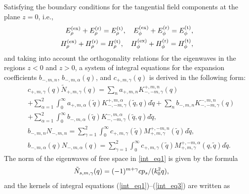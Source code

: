 \documentclass[summary]{URSIGASS2020}
\def\f{\phi}
\begin{document}
Satisfying the boundary conditions for the tangential field components at the plane $ z=0 $, i.e.,
\begin{eqnarray}\label{bound_cond}
&&\hspace{-5mm}{E}^{(\rm ex)}_{\rho}+{E}^{(\rm r)}_{\rho}={E}^{(\rm t)}_{\rho},\quad {E}^{(\rm ex)}_{\f}+{E}^{(\rm r)}_{\f}={E}^{(\rm t)}_{\f},\nonumber\\
&&\hspace{-5mm}{H}^{(\rm ex)}_{\rho}+{H}^{(\rm r)}_{\rho}={H}^{(\rm t)}_{\rho},\quad {H}^{(\rm ex)}_{\f}+{H}^{(\rm r)}_{\f}={H}^{(\rm t)}_{\f},
\end{eqnarray}
and taking into account the orthogonality relations for the eigenwaves in the regions $ z<0 $ and $ z>0 $, a system of integral equations for the expansion coefficients $ b_{-,m,n} $, $ b_{-,m,\alpha}(q) $, and $ c_{+,m,\gamma}(q) $ is derived in the following form:
\begin{align}
&c_{+,m,\gamma}(q)\tilde{N}_{+,m,\gamma}(q)=\sum_{n}a_{+,m,n}K_{-,-m,\gamma}^{+,m,n}(q) \nonumber\\
&+ \sum_{\alpha=1}^{2}\int_{0}^{\infty}\!\!\!a_{+,m,\alpha}(\tilde{q})K_{-,-m,\gamma}^{+,m,\alpha}(\tilde{q},q)d\tilde{q} \nonumber+\sum_{n}b_{-,m,n}K_{-,-m,\gamma}^{-,m,n}(q) \\
&+\sum_{\alpha=1}^{2}\int_{0}^{\infty}\!\!\!b_{-,m,\alpha}(\tilde{q})K_{-,-m,\gamma}^{-,m,\alpha}(\tilde{q},q)d\tilde{q}, \label{int_eq1} \\ 
&b_{-,m,n}N_{-,m,n}=\sum_{\gamma=1}^{2}\int_{0}^{\infty}\!\!\!\!c_{+,m,\gamma}(\tilde{q})M_{+,m,\gamma}^{+,-m,n}(\tilde{q})d\tilde{q}, \label{int_eq2} \\
&b_{-,m,\alpha}({q})N_{-,m,\alpha}({q})\!=\!\!\!\sum_{\gamma=1}^{2}\!\int_{0}^{\infty}\!\!\!\!\!\!\!c_{+,m,\gamma}(\tilde{q})M_{+,m,\gamma}^{+,-m,\alpha}(q,\tilde{q})d\tilde{q}. \label{int_eq3}
\end{align}
The norm of the eigenwaves of free space in \eqref{int_eq1} is given by the formula
\begin{equation}\label{norm_free_space}
\hspace{-7mm} {\tilde N}_{s,m,{\gamma}}({q})=(-1)^{m+\gamma}{c}{p_s}/({k_0^2}{q}),
\end{equation}
and the kernels of integral equations (\ref{int_eq1})--(\ref{int_eq3}) are written as
\end{document}
